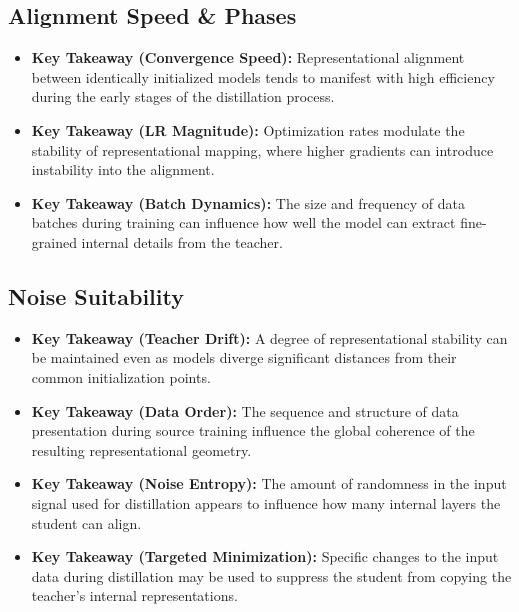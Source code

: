 \subsection{Alignment Speed \& Phases}
\begin{itemize}
     \item \textbf{Key Takeaway (Convergence Speed):} Representational alignment between identically initialized models tends to manifest with high efficiency during the early stages of the distillation process.
     \item \textbf{Key Takeaway (LR Magnitude):} Optimization rates modulate the stability of representational mapping, where higher gradients can introduce instability into the alignment. 
     \item \textbf{Key Takeaway (Batch Dynamics):} The size and frequency of data batches during training can influence how well the model can extract fine-grained internal details from the teacher.
 \end{itemize}


\subsection{Noise Suitability}
\begin{itemize}
     \item \textbf{Key Takeaway (Teacher Drift):} A degree of representational stability can be maintained even as models diverge significant distances from their common initialization points.
     \item \textbf{Key Takeaway (Data Order):} The sequence and structure of data presentation during source training influence the global coherence of the resulting representational geometry.
     \item \textbf{Key Takeaway (Noise Entropy):} The amount of randomness in the input signal used for distillation appears to influence how many internal layers the student can align.
     \item \textbf{Key Takeaway (Targeted Minimization):} Specific changes to the input data during distillation may be used to suppress the student from copying the teacher's internal representations.
 \end{itemize}

